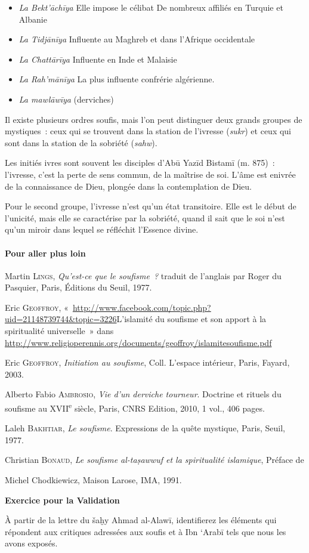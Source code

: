 \begin{itemize}
\item
  \textit{La Bekt'āchīya}
Elle impose le célibat
De nombreux affiliés en Turquie et Albanie


\item
  \textit{La Tidjānīya}
Influente au Maghreb et dans l'Afrique occidentale


\item
  \textit{La Chattārīya}
Influente en Inde et Malaisie

\item
  \textit{La Rah'mānīya}
La plus influente confrérie algérienne.


\item
  \textit{La mawlāwīya} (derviches)
\end{itemize}

Il existe plusieurs ordres soufis, mais l'on peut distinguer deux grands
groupes de mystiques~: ceux qui se trouvent dans la station de l'ivresse
(\emph{sukr}) et ceux qui sont dans la station de la sobriété
(\emph{sahw}).

Les initiés ivres sont souvent les disciples d'Abū Yazīd Bistamī (m.
875)~: l'ivresse, c'est la perte de sens commun, de la maîtrise de soi.
L'âme est enivrée de la connaissance de Dieu, plongée dans la
contemplation de Dieu.

Pour le second groupe, l'ivresse n'est qu'un état transitoire. Elle est
le début de l'unicité, mais elle se caractérise par la sobriété, quand
il sait que le soi n'est qu'un miroir dans lequel se réfléchit l'Essence
divine.

\paragraph{Pour aller plus loin}

Martin \textsc{Lings}, \emph{Qu'est-ce que le soufisme~?} traduit de
l'anglais par Roger du Pasquier, Paris, Éditions du Seuil, 1977.

Eric \textsc{Geoffroy},
«~\url{http://www.facebook.com/topic.php?uid=21148739744\&topic=3226}{L'islamité
du soufisme et son apport à la spiritualité universelle}~» dans
\url{http://www.religioperennis.org/documents/geoffroy/islamitesoufisme.pdf}

Eric \textsc{Geoffroy}, \emph{Initiation au soufisme}, Coll. L'espace
intérieur, Paris, Fayard, 2003.

Alberto Fabio \textsc{Ambrosio}, \emph{Vie d'un derviche tourneur}.
Doctrine et rituels du soufisme au XVII\textsuperscript{e} siècle,
Paris, CNRS Edition, 2010, 1 vol., 406 pages.

Laleh \textsc{Bakhtiar}, \emph{Le soufisme}. Expressions de la quête
mystique, Paris, Seuil, 1977.

Christian \textsc{Bonaud}, \emph{Le soufisme al-taṣawwuf et la
spiritualité islamique}, Préface de

Michel Chodkiewicz, Maison Larose, IMA, 1991.

\textbf{Exercice pour la Validation}

À partir de la lettre du šaḫy Ahmad al-Alawī, identifierez les éléments
qui répondent aux critiques adressées aux soufis et à Ibn `Arabī tels
que nous les avons exposés.


